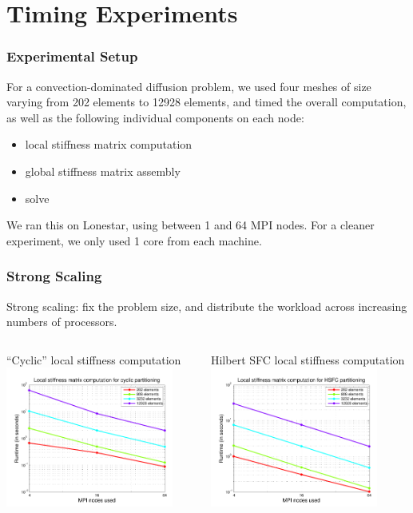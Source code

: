 \documentclass[mathserif]{beamer}
\begin{document}
\section{Timing Experiments}

\begin{frame}
\frametitle{Experimental Setup}
For a convection-dominated diffusion problem, we used four meshes of size varying from 202 elements to 12928 elements, and timed the overall computation, as well as the following individual components on each node:
\begin{itemize}
\item local stiffness matrix computation
\item global stiffness matrix assembly
\item solve
\end{itemize}
We ran this on Lonestar, using between 1 and 64 MPI nodes.  For a cleaner experiment, we only used 1 core from each machine.
\end{frame}

\begin{frame}
\frametitle{Strong Scaling}
Strong scaling: fix the problem size, and distribute the workload across increasing numbers of processors.
\begin{columns}[c]
\begin{column}{5.5cm}
\begin{block}{``Cyclic'' local stiffness computation}
\includegraphics[width=5.5cm]{../figs/scalingFigs/cyclicStrongScalingLocal.pdf}
\end{block}
\end{column}
\begin{column}{5.5cm}
\begin{block}{Hilbert SFC local stiffness computation}
\includegraphics[width=5.5cm]{../figs/scalingFigs/hsfcStrongScalingLocal.pdf}
\end{block}
\end{column}
\end{columns}
\end{frame}
\end{document}
